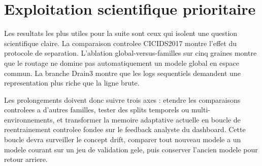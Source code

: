 \section{Exploitation scientifique prioritaire}
Les resultats les plus utiles pour la suite sont ceux qui isolent une question scientifique claire. La comparaison controlee CICIDS2017 montre l'effet du protocole de separation. L'ablation global-versus-familles sur cinq graines montre que le routage ne domine pas automatiquement un modele global en espace commun. La branche Drain3 montre que les logs sequentiels demandent une representation plus riche que la ligne brute.

Les prolongements doivent donc suivre trois axes : etendre les comparaisons controlees a d'autres familles, tester des splits temporels ou multi-environnements, et transformer la memoire adaptative actuelle en boucle de reentrainement controlee fondee sur le feedback analyste du dashboard. Cette boucle devra surveiller le concept drift, comparer tout nouveau modele a un modele courant sur un jeu de validation gele, puis conserver l'ancien modele pour retour arriere.
